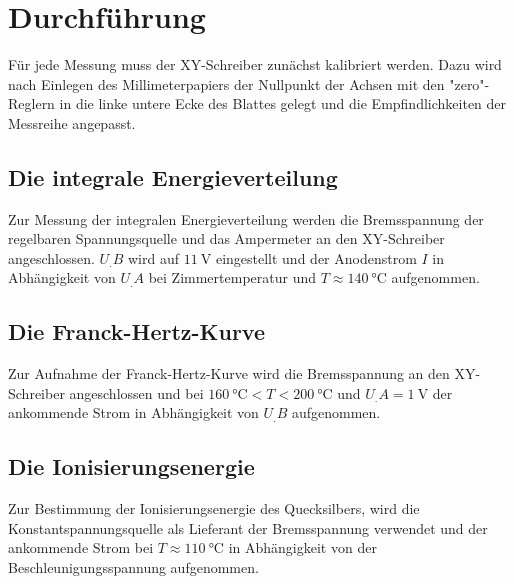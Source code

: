 \section{Durchführung}
\label{sec:Durchführung}
Für jede Messung muss der XY-Schreiber zunächst kalibriert werden. Dazu wird nach Einlegen des Millimeterpapiers der Nullpunkt der Achsen mit den "zero"-Reglern in die linke untere Ecke des Blattes gelegt und die Empfindlichkeiten der Messreihe angepasst.
\subsection{Die integrale Energieverteilung}
Zur Messung der integralen Energieverteilung werden die Bremsspannung der regelbaren Spannungsquelle und das Ampermeter an den XY-Schreiber angeschlossen. $U_.B$ wird auf $\SI{11}{\volt}$ eingestellt und der Anodenstrom $I$ in Abhängigkeit von $U_.A$ bei Zimmertemperatur und $T\approx \SI{140}{\celsius}$ aufgenommen.
\subsection{Die Franck-Hertz-Kurve}
Zur Aufnahme der Franck-Hertz-Kurve wird die Bremsspannung an den XY-Schreiber angeschlossen und bei $\SI{160}{\celsius}<T<\SI{200}{\celsius}$ und $U_.A=\SI{1}{\volt}$
der ankommende Strom in Abhängigkeit von $U_.B$ aufgenommen.
\subsection{Die Ionisierungsenergie}
Zur Bestimmung der Ionisierungsenergie des Quecksilbers, wird die Konstantspannungsquelle als Lieferant der Bremsspannung verwendet und der ankommende Strom bei $T\approx\SI{110}{\celsius}$ in Abhängigkeit von der Beschleunigungsspannung aufgenommen.